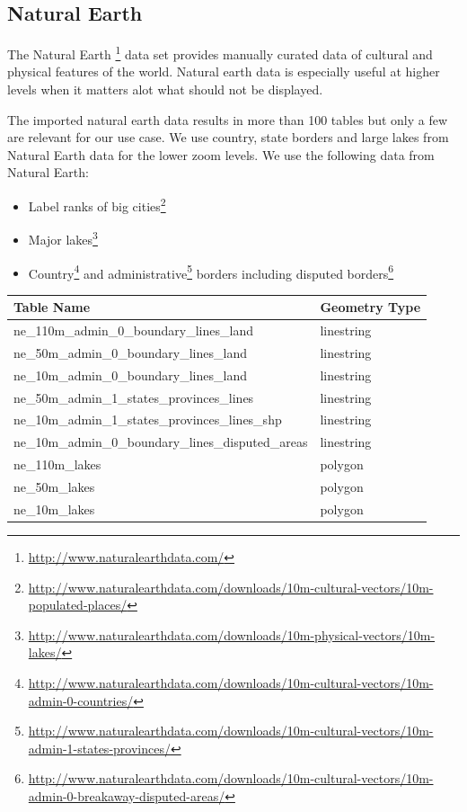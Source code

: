 \newpage
\subsection{Natural Earth}

The Natural Earth \footnote{\url{http://www.naturalearthdata.com/}} data set provides manually curated data of cultural and physical features of the world. Natural earth data is especially useful at higher levels when it matters alot what should not be displayed.

The imported natural earth data results in more than 100 tables but only a few
are relevant for our use case.
We use country, state borders and large lakes from Natural Earth data for the lower zoom
levels.
We use the following data from Natural Earth:

\begin{itemize}
\item Label ranks of big cities\footnote{\url{http://www.naturalearthdata.com/downloads/10m-cultural-vectors/10m-populated-places/}}
\item Major lakes\footnote{\url{http://www.naturalearthdata.com/downloads/10m-physical-vectors/10m-lakes/}}
\item Country\footnote{\url{http://www.naturalearthdata.com/downloads/10m-cultural-vectors/10m-admin-0-countries/}} and administrative\footnote{\url{http://www.naturalearthdata.com/downloads/10m-cultural-vectors/10m-admin-1-states-provinces/}} borders including disputed borders\footnote{\url{http://www.naturalearthdata.com/downloads/10m-cultural-vectors/10m-admin-0-breakaway-disputed-areas/}}
\end{itemize}



\begin{flushleft}
    \begin{tabular}{ll}
    \hline
    Table Name                                          & Geometry Type \\
    \hline
    ne\_110m\_admin\_0\_boundary\_lines\_land           & linestring    \\
    ne\_50m\_admin\_0\_boundary\_lines\_land            & linestring    \\
    ne\_10m\_admin\_0\_boundary\_lines\_land            & linestring    \\
    ne\_50m\_admin\_1\_states\_provinces\_lines         & linestring    \\
    ne\_10m\_admin\_1\_states\_provinces\_lines\_shp    & linestring    \\
    ne\_10m\_admin\_0\_boundary\_lines\_disputed\_areas & linestring    \\
    ne\_110m\_lakes                                     & polygon       \\
    ne\_50m\_lakes                                      & polygon       \\
    ne\_10m\_lakes                                      & polygon       \\
    \end{tabular}
\end{flushleft}

